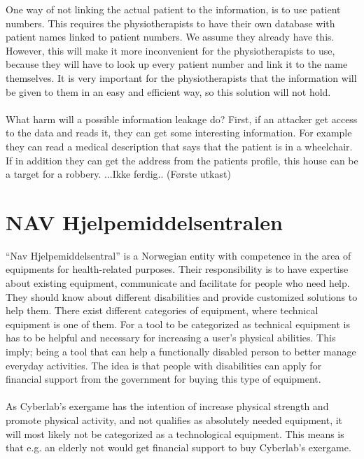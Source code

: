 One way of not linking the actual patient to the information, is to use patient numbers. This requires the physiotherapists to have their own database with patient names linked to patient numbers. We assume they already have this. However, this will make it more inconvenient for the physiotherapists to use, because they will have to look up every patient number and link it to the name themselves. It is very important for the physiotherapists that the information will be given to them in an easy and efficient way, so this solution will not hold. \\ \\
What harm will a possible information leakage do? First, if an attacker get access to the data and reads it, they can get some interesting information. For example they can read a medical description that says that the patient is in a wheelchair. If in addition they can get the address from the patients profile, this house can be a target for a robbery. ...Ikke ferdig.. (Første utkast)

\section{NAV Hjelpemiddelsentralen}
“Nav Hjelpemiddelsentral” is a Norwegian entity with competence in the area of equipments for health-related purposes. Their responsibility is to have expertise about existing equipment, communicate and facilitate for people who need help. They should know about different disabilities and provide customized solutions to help them. There exist different categories of equipment, where technical equipment is one of them. For a tool to be categorized as technical equipment is has to be helpful and necessary for increasing a user’s physical abilities. This imply; being a tool that can help a functionally disabled person to better manage everyday activities. The idea is that people with disabilities can apply for financial support from the government for buying this type of equipment.\\ \\
As Cyberlab’s exergame has the intention of increase physical strength and promote physical activity, and not qualifies as absolutely needed equipment, it will most likely not be categorized as a technological equipment. This means is that e.g. an elderly not would get financial support to buy Cyberlab’s exergame.

